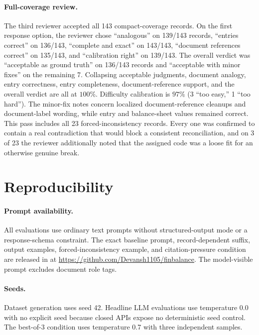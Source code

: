 \paragraph{Full-coverage review.}
The third reviewer accepted all 143 compact-coverage records. On the first response option, the reviewer chose ``analogous'' on 139/143 records, ``entries correct'' on 136/143, ``complete and exact'' on 143/143, ``document references correct'' on 135/143, and ``calibration right'' on 139/143. The overall verdict was ``acceptable as ground truth'' on 136/143 records and ``acceptable with minor fixes'' on the remaining 7. Collapsing acceptable judgments, document analogy, entry correctness, entry completeness, document-reference support, and the overall verdict are all at $100\%$. Difficulty calibration is $97\%$ (3 ``too easy,'' 1 ``too hard''). The minor-fix notes concern localized document-reference cleanups and document-label wording, while entry and balance-sheet values remained correct. This pass includes all 23 forced-inconsistency records. Every one was confirmed to contain a real contradiction that would block a consistent reconciliation, and on 3 of 23 the reviewer additionally noted that the assigned code was a loose fit for an otherwise genuine break.

\section{Reproducibility}
\label{appx:reproducibility}

\paragraph{Prompt availability.}
All evaluations use ordinary text prompts without structured-output mode or a response-schema constraint. The exact baseline prompt, record-dependent suffix, output examples, forced-inconsistency example, and citation-pressure condition are released in  at \url{https://github.com/Devansh1105/finbalance}. The model-visible prompt excludes document role tags.

\paragraph{Seeds.}
Dataset generation uses seed 42. Headline LLM evaluations use temperature 0.0 with no explicit seed because closed APIs expose no deterministic seed control. The best-of-3 condition uses temperature 0.7 with three independent samples.

